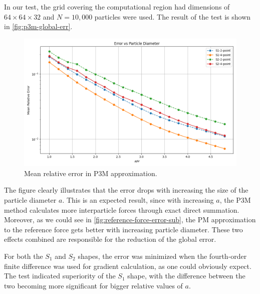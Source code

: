 In our test, the grid covering the computational region had dimensions of $64\times 64\times 32$ and $N=10{,}000$ particles were used.
The result of the test is shown in \autoref{fig:p3m-global-err}.
\begin{figure}[htp]
    \centering
    \includegraphics[scale=0.5]{img/err_vs_part_diam_p3m.png}
    \caption{Mean relative error in P3M approximation.}
    \label{fig:p3m-global-err}
\end{figure}
The figure clearly illustrates that the error drops with increasing the size of the particle diameter $a$.
This is an expected result, since with increasing $a$, the P3M method calculates more interparticle forces through exact direct summation.
Moreover, as we could see in \autoref{fig:reference-force-error-sub}, the PM approximation to the reference force gets better with increasing particle diameter.
These two effects combined are responsible for the reduction of the global error.

For both the $S_1$ and $S_2$ shapes, the error was minimized when the fourth-order finite difference was used for gradient calculation, as one could obviously expect.
The test indicated superiority of the $S_1$ shape, with the difference between the two becoming more significant for bigger relative values of $a$.